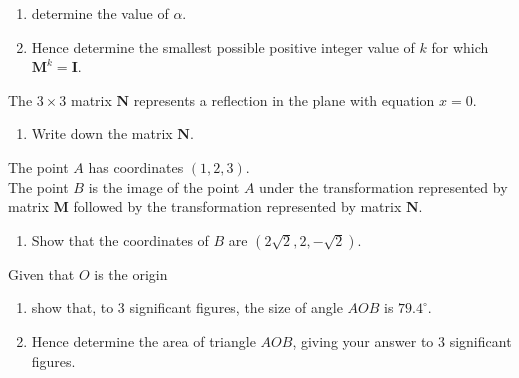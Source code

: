 \documentclass[leqno]{article}
\begin{document}
\begin{enumerate}[
  label=\textbf{\arabic*.},
  leftmargin=*,
  topsep=0pt,
  partopsep=0pt,
  parsep=0pt
]
\begin{enumerate}[label=\textbf{(\alph*)}]
  \item determine the value of $\alpha$.  \\
  \item Hence determine the smallest possible positive integer value of $k$ for which $\mathbf{M}^k = \mathbf{I}$.  \\
\end{enumerate}

The $3\times 3$ matrix $\mathbf{N}$ represents a reflection in the plane with equation $x = 0$. \\

\begin{enumerate}[label=\textbf{(\alph*)}, resume]
  \item Write down the matrix $\mathbf{N}$.  \\
\end{enumerate}

The point $A$ has coordinates $(1, 2, 3)$. \\

The point $B$ is the image of the point $A$ under the transformation represented by matrix $\mathbf{M}$ followed by the transformation represented by matrix $\mathbf{N}$. \\

\begin{enumerate}[label=\textbf{(\alph*)}, resume]
  \item Show that the coordinates of $B$ are $(2\sqrt{2}, 2, -\sqrt{2})$.  \\
\end{enumerate}

Given that $O$ is the origin \\

\begin{enumerate}[label=\textbf{(\alph*)}, resume]
  \item show that, to $3$ significant figures, the size of angle $AOB$ is $79.4^\circ$.  \\
  \item Hence determine the area of triangle $AOB$, giving your answer to $3$ significant figures.  \\
\end{enumerate}

\newpage

\questionitem


\end{enumerate}
\end{document}
